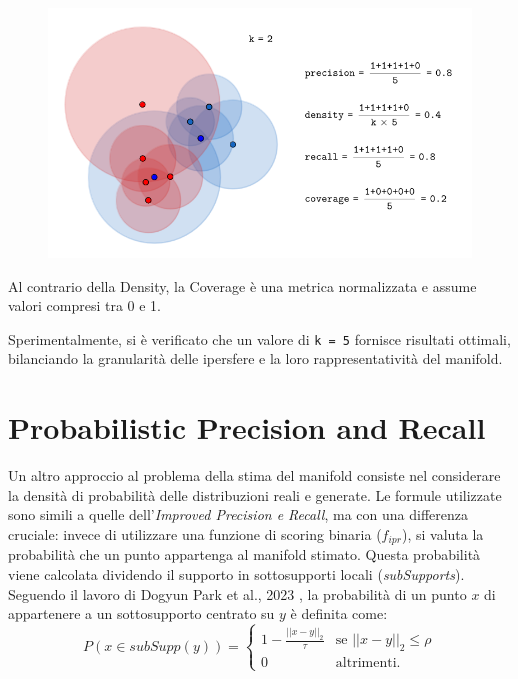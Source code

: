 \begin{figure}[htbp]
    \centering
    \includegraphics[width=\linewidth]{../images/prdc.png}
\end{figure}

Al contrario della Density, la Coverage è una metrica normalizzata e assume valori compresi tra 0 e 1.

Sperimentalmente, si è verificato che un valore di \texttt{k = 5} fornisce risultati ottimali, bilanciando la granularità delle ipersfere e la loro rappresentatività del manifold.

\section{Probabilistic Precision and Recall}  
\label{sec:probabilistic-precision-and-recall}

Un altro approccio al problema della stima del manifold consiste nel considerare la densità di probabilità delle distribuzioni reali e generate. Le formule utilizzate sono simili a quelle dell'\textit{Improved Precision e Recall},
ma con una differenza cruciale: invece di utilizzare una funzione di scoring binaria (\(f_{ipr}\)), si valuta la probabilità che un punto appartenga al manifold stimato. 
Questa probabilità viene calcolata dividendo il supporto in sottosupporti locali (\textit{subSupports}). 
Seguendo il lavoro di Dogyun Park et al., 2023 \cite{4ProbabilisticPrecisionRecall}, la probabilità di un punto \(x\) di appartenere a un sottosupporto centrato su \(y\) è definita come:
\begin{equation}
    P(x \in subSupp(y)) = 
    \begin{cases}
        1 - \frac{||x - y||_2}{\tau} & \text{se } ||x - y||_2 \leq \rho \\
        0 & \text{altrimenti.}
    \end{cases}
\end{equation}

